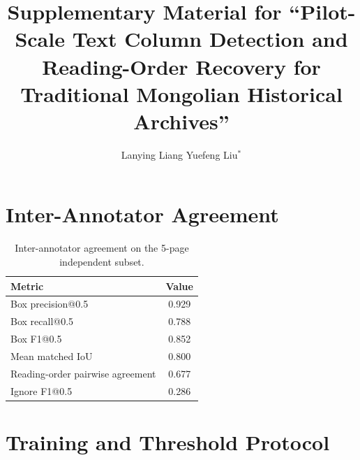 \documentclass[12pt]{article}
\begin{document}
\title{Supplementary Material for ``Pilot-Scale Text Column Detection and Reading-Order Recovery for Traditional Mongolian Historical Archives''}
\author{Lanying Liang \quad Yuefeng Liu$^*$}
\date{}
\maketitle

\section{Inter-Annotator Agreement}
\begin{table}[h]
\centering
\caption{Inter-annotator agreement on the 5-page independent subset.}
\begin{tabular}{lc}
\toprule
Metric & Value \\
\midrule
Box precision@0.5 & 0.929 \\
Box recall@0.5 & 0.788 \\
Box F1@0.5 & 0.852 \\
Mean matched IoU & 0.800 \\
Reading-order pairwise agreement & 0.677 \\
Ignore F1@0.5 & 0.286 \\
\bottomrule
\end{tabular}
\end{table}

\section{Training and Threshold Protocol}
\begin{table}[h]
\centering
\caption{Training-budget and threshold-selection protocol.}
\end{table}
\end{document}

